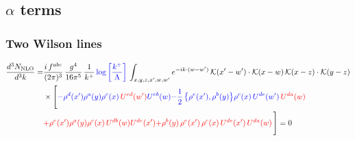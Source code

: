 \documentclass[9pt]{article}
\numberwithin{equation}{section}
\begin{document}
\subsection{$\alpha$ terms}
\subsubsection{Two Wilson lines}
\begin{align}
\frac{d^{3}N_{\rm NLO}}{d^{3}k}= & \frac{i\,f^{abc}}{(2\pi)^{3}}\,\frac{g^{4}}{16\pi^{5}}\,\frac{1}{k^{+}}\,{\color{blue}\log{\left[\frac{k^{+}}{\Lambda}\right]}}\,\int_{x,y,z,x',w,w'}e^{-ik\cdot (w-w')}\,\mathcal{K}(x'-w')\cdot\mathcal{K}(x-w)\,\mathcal{K}(x-z)\cdot\mathcal{K}(y-z)\notag\\
&\times\Bigg[{\color{blue}-\rho^{d}(x') \rho^{a}(y) \rho^{c}(x)\,{\color{red}U^{ed}(w')} U^{e b}(w)}{\color{blue}-\frac{1}{2}\,\big\{\rho^{e}(x'),\rho^{b}(y)\big\}\rho^{c}(x)\,U^{de}(w')\,{\color{red}U^{da}(w)}}\notag \\ & {\color{red}+\rho^{e}(x') \rho^{a}(y) \rho^{c}(x)\, U^{d b}(w) {\color{red}U^{de}(x')}}{\color{red}+\rho^{b}(y)\,\rho^{e}(x')\,\rho^{c}(x)\,U^{de}(x')\,{\color{red}U^{da}(w)}}\,\Bigg] = 0
\end{align}
\end{document}
